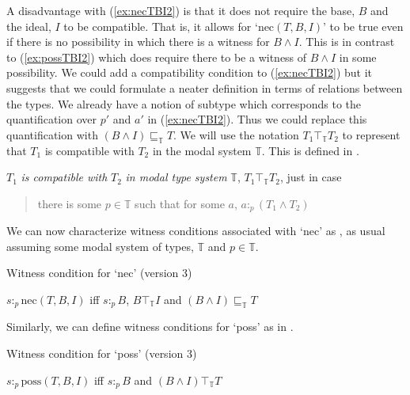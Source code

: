 A disadvantage with (\ref{ex:necTBI2}) is that it does not require the
base, $B$ and the ideal, $I$ to be compatible.  That is, it allows for
`$\text{nec}(T,B,I)$' to be true even if there is no possibility in
which there is a witness for $B\wedge I$.  This is in contrast to
(\ref{ex:possTBI2}) which does require there to be a witness of
$B\wedge I$ in some possibility.  We could add a compatibility
condition to (\ref{ex:necTBI2}) but it suggests that we could
formulate a neater definition in terms of relations between the
types.  We already have a notion of subtype which corresponds to the
quantification over $p'$ and $a'$ in (\ref{ex:necTBI2}).  Thus we
could replace this quantification with $(B\wedge
I)\sqsubseteq_{\mathbb{T}}T$.  We will use the notation $T_1\top_{\mathbb{T}}T_2$
to represent that $T_1$ is compatible with $T_2$ in the modal system
$\mathbb{T}$.  This is defined in \nexteg{}.
\begin{ex} 
$T_1$ \textit{is compatible with} $T_2$ \textit{in modal type system}
$\mathbb{T}$, $T_1\top_{\mathbb{T}}T_2$, just in case
\begin{quote}
there is some
$p\in\mathbb{T}$ such that for some $a$, $a:_p(T_1\wedge T_2)$
\end{quote}
\end{ex} 
We can now characterize witness conditions associated with `nec' as
\nexteg{}, as usual assuming some modal system of types, $\mathbb{T}$
and $p\in\mathbb{T}$.
\begin{ex}
  Witness condition for `nec' (version 3)

  $s:_p\text{nec}(T,B,I)$ iff $s:_pB$, $B\top_{\mathbb{T}}I$ and
  $(B\wedge I)\sqsubseteq_{\mathbb{T}}T$
 
 
 
   
\end{ex}
Similarly, we can define witness conditions for `poss' as in
\nexteg{}.
\begin{ex}
  Witness condition for `poss' (version 3)

  $s:_p\text{poss}(T,B,I)$ iff $s:_pB$ and $(B\wedge I)\top_{\mathbb{T}}T$
 
 
 
  
 
\end{ex} 

